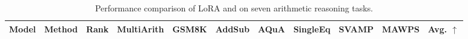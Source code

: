 \begin{table*}[!b]
    \caption{Performance comparison of LoRA and \celora on seven arithmetic reasoning tasks.}
    \label{table:math_accuracy}
    \vspace{0.5em}
    \centering
    \begin{adjustbox}{max width=\textwidth}
    \begin{tabular}{l l c c c c c c c c c}
        \toprule
        \textbf{Model} & \textbf{Method} & \textbf{Rank} & \textbf{MultiArith} & \textbf{GSM8K} & \textbf{AddSub} & \textbf{AQuA} & \textbf{SingleEq} & \textbf{SVAMP} & \textbf{MAWPS} & \textbf{Avg. $\uparrow$} \\
        \midrule

        
        

\end{tabular}
\end{adjustbox}
\end{table*}
